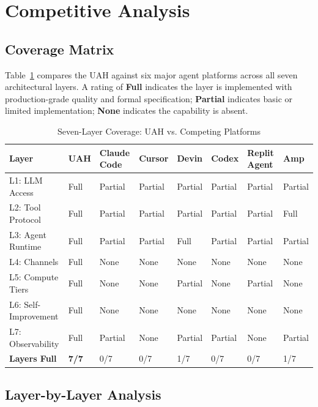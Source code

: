 \section{Competitive Analysis}

\label{sec:competitive}

\subsection{Coverage Matrix}

Table~\ref{tab:competitive} compares the UAH against six major agent platforms
across all seven architectural layers. A rating of \textbf{Full} indicates the
layer is implemented with production-grade quality and formal specification;
\textbf{Partial} indicates basic or limited implementation; \textbf{None}
indicates the capability is absent.

\begin{table}[H]
\centering
\caption{Seven-Layer Coverage: UAH vs. Competing Platforms}
\label{tab:competitive}
\setlength{\tabcolsep}{4pt}
\begin{tabularx}{\textwidth}{lXXXXXXX}
\toprule
\textbf{Layer} & \textbf{UAH} & \textbf{Claude Code} & \textbf{Cursor} &
\textbf{Devin} & \textbf{Codex} & \textbf{Replit Agent} & \textbf{Amp} \\
\midrule
L1: LLM Access      & Full    & Partial & Partial & Partial & Partial & Partial & Partial \\
L2: Tool Protocol   & Full    & Partial & Partial & Partial & Partial & Partial & Full    \\
L3: Agent Runtime   & Full    & Partial & Partial & Full    & Partial & Partial & Partial \\
L4: Channels        & Full    & None    & None    & None    & None    & None    & None    \\
L5: Compute Tiers   & Full    & None    & None    & Partial & None    & Partial & None    \\
L6: Self-Improvement & Full   & None    & None    & None    & None    & None    & None    \\
L7: Observability   & Full    & Partial & None    & Partial & Partial & None    & Partial \\
\midrule
\textbf{Layers Full} & \textbf{7/7} & 0/7 & 0/7 & 1/7 & 0/7 & 0/7 & 1/7 \\
\bottomrule
\end{tabularx}
\end{table}

\subsection{Layer-by-Layer Analysis}

